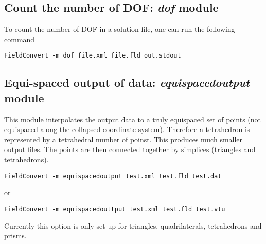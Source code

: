 \subsection{Count the number of DOF: \textit{dof} module}
To count the number of DOF in a solution file,
one can run the following command
%
\begin{lstlisting}[style=BashInputStyle]
FieldConvert -m dof file.xml file.fld out.stdout
\end{lstlisting}
%
%
%
\subsection{Equi-spaced output of data: \textit{equispacedoutput} module}
This module interpolates the output data to a truly equispaced set of
points (not equispaced along the collapsed coordinate
system). Therefore a tetrahedron is represented by a tetrahedral
number of poinst. This produces much smaller output files. The points
are then connected together by simplices (triangles and tetrahedrons).

\begin{lstlisting}[style=BashInputStyle]
FieldConvert -m equispacedoutput test.xml test.fld test.dat
\end{lstlisting}

or

\begin{lstlisting}[style=BashInputStyle]
FieldConvert -m equispacedouttput test.xml test.fld test.vtu
\end{lstlisting}


\begin{notebox}
Currently this option is only set up for triangles, quadrilaterals,
tetrahedrons and prisms.
\end{notebox}


